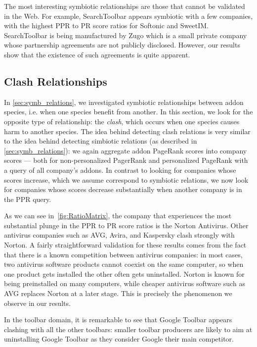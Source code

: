 \documentclass[ijoc,nonblindrev]{informs3} %
\numberwithin{equation}{subsection}
\begin{document}
The most interesting symbiotic relationships are those that cannot be validated in the Web. For example, SearchToolbar appears symbiotic with a few companies, with the highest PPR to PR score ratios for Softonic and SweetIM. SearchToolbar is being manufactured by Zugo which is a small private company whose partnership agreements are not publicly disclosed. However, our results show that the existence of such agreements is quite apparent.

\subsection{Clash Relationships}
\label{sec:clash_relations}

In \autoref{sec:symb_relations}, we investigated symbiotic relationships between addon species, i.e. when one species benefit from another. In this section, we look for the opposite type of relationship: the \emph{clash}, which occurs when one species causes harm to another species. The idea behind detecting clash relations is very similar to the idea behind detecting simbiotic relations (as described in \autoref{sec:symb_relations}): we again aggregate addon PageRank scores into company scores --- both for non-personalized PagerRank and personalized PageRank with a query of all company's addons. In contrast to looking for companies whose scores increase, which we assume correspond to symbiotic relations, we now look for companies whose scores decrease substantially when another company is in the PPR query. 

As we can see in~\autoref{fig:RatioMatrix}, the company that experiences the most substantial plunge in the PPR to PR score ratios is the Norton Antivirus. Other antivirus companies such as AVG, Avira, and Kaspersky clash strongly with Norton. A fairly straightforward validation for these results comes from the fact that there is a known competition between antivirus companies: in most cases, two antivirus software products cannot coexist on the same computer, so when one product gets installed the other often gets uninstalled. Norton is known for being preinstalled on many computers, while cheaper antivirus software such as AVG replaces Norton at a later stage. This is precisely the phenomenon we observe in our results.

In the toolbar domain, it is remarkable to see that Google Toolbar appears clashing with all the other toolbars: smaller toolbar producers are likely to aim at uninstalling Google Toolbar as they consider Google their main competitor.
\end{document}

